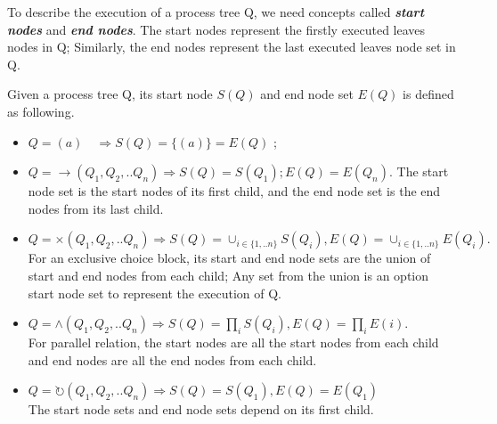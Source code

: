 To describe the execution of  a process tree Q, we need concepts called \textbf{\emph{start nodes}} and \textbf{\emph{end nodes}}. The start nodes represent the firstly executed leaves nodes in Q; Similarly, the end nodes represent the last executed leaves node set in Q. 
\begin{definition}
Given a process tree Q, its start node $S(Q)$ and end node set $E(Q)$ is defined as following. 
\begin{itemize}
	\item  $Q=(a) \quad \Rightarrow S(Q)=\{(a)\}=E(Q)$ ; 
	\item  $Q= \rightarrow(Q_1 , Q_2 ,.. Q_n) \Rightarrow S(Q)= S(Q_1); E(Q)=E(Q_n)$. The start node set is the start nodes of its first child, and the end node set is the end nodes from its last child.
	\item  $Q= \times(Q_1 , Q_2 ,.. Q_n) \Rightarrow S(Q)= \cup_{i\in \{1,..n\}}S(Q_i),E(Q)= \cup_{i\in \{1,..n\}}E(Q_i).$ \\For an exclusive choice block, its start and end node sets are the union of start and end nodes from each child; Any set from the union is an option start node set to represent the execution of Q. 
	\item $Q= \land (Q_1 , Q_2 ,.. Q_n) \Rightarrow S(Q)= \prod_{i} S(Q_i), E(Q)=\prod_{i} E(i)$. \\For parallel relation, the start nodes are all the start nodes from each child and end nodes are all the end nodes from each child.
	\item $Q= \circlearrowright(Q_1 , Q_2 ,.. Q_n) \Rightarrow S(Q)=S(Q_1), E(Q)=E(Q_1)$ \\The start node sets and end node sets depend on its first child.
\end{itemize}
\end{definition}

